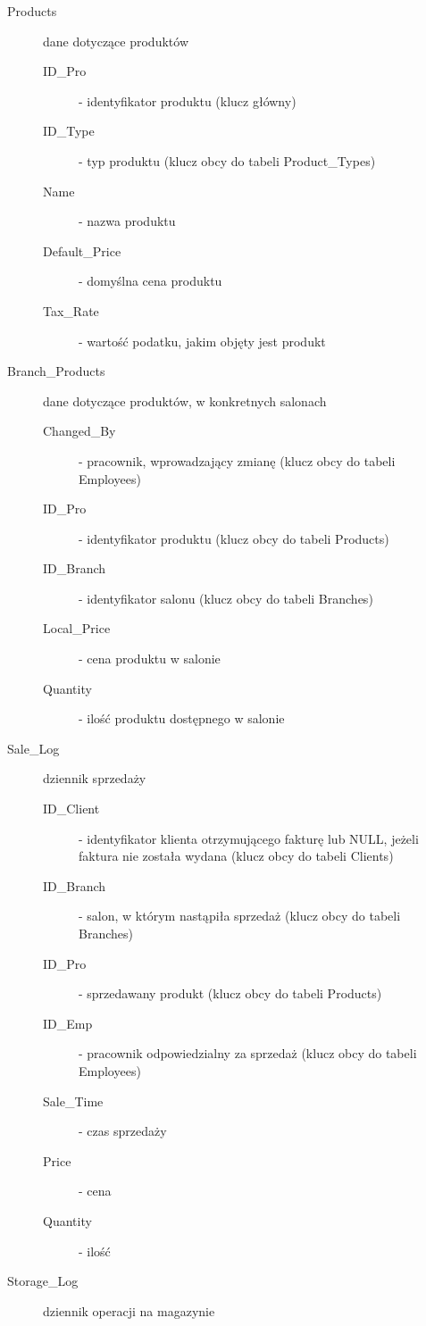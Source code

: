\begin{description}
\begin{description}
    \end{description}
\item[Products] dane dotyczące produktów
    \begin{description}
    \item[ID\_Pro] - identyfikator produktu (klucz główny)
    \item[ID\_Type] - typ produktu (klucz obcy do tabeli Product\_Types)
    \item[Name] - nazwa produktu
    \item[Default\_Price] - domyślna cena produktu
    \item[Tax\_Rate] - wartość podatku, jakim objęty jest produkt
    \end{description}
\item[Branch\_Products] dane dotyczące produktów, w konkretnych salonach
    \begin{description}
    \item[Changed\_By] - pracownik, wprowadzający zmianę (klucz obcy do tabeli Employees)
    \item[ID\_Pro] - identyfikator produktu (klucz obcy do tabeli Products)
    \item[ID\_Branch] - identyfikator salonu (klucz obcy do tabeli Branches)
    \item[Local\_Price] - cena produktu w salonie
    \item[Quantity] - ilość produktu dostępnego w salonie
    \end{description}
\item[Sale\_Log] dziennik sprzedaży
    \begin{description}
    \item[ID\_Client] - identyfikator klienta otrzymującego fakturę lub NULL, jeżeli faktura nie została wydana (klucz obcy do tabeli Clients)
    \item[ID\_Branch] - salon, w którym nastąpiła sprzedaż (klucz obcy do tabeli Branches)
    \item[ID\_Pro] - sprzedawany produkt (klucz obcy do tabeli Products)
    \item[ID\_Emp] - pracownik odpowiedzialny za sprzedaż (klucz obcy do tabeli Employees)
    \item[Sale\_Time] - czas sprzedaży
    \item[Price] - cena
    \item[Quantity] - ilość
    \end{description}
\item[Storage\_Log] dziennik operacji na magazynie

\end{description}

